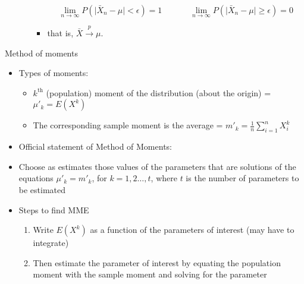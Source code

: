 \documentclass{article}
\newcommand{\convp}[2]{#1 \overset{p} \to #2}		%
\begin{document}
\begin{itemize}
\begin{itemize}
\begin{itemize}
            \[\lim_{n \to \infty} P(\lvert \bar{X}_n - \mu \rvert < \epsilon) = 1 \hspace{40pt} \lim_{n \to \infty} P(\lvert \bar{X}_n - \mu \rvert \ge \epsilon) = 0\] 
            \item[] that is, $\convp{\bar{X}}{\mu}$.
        \end{itemize}
    \end{itemize}
\end{itemize}\bigskip

Method of moments
\begin{itemize}
    \item Types of moments:
    \begin{itemize}
        \item $k^\text{th}$ (population) moment of the distribution (about the origin) = $\mu'_k = E(X^k)$
        \item The corresponding sample moment is the average = $\displaystyle m'_k = \frac{1}{n} \sum_{i = 1}^n {X^k_i}$
    \end{itemize}
    \item Official statement of Method of Moments:
    \item[] Choose as estimates those values of the parameters that are solutions of the equations $\mu'_k = m'_k$, for $k = 1, 2 \ldots, t$, where $t$ is the number of parameters to be estimated
    \item Steps to find MME
    \begin{enumerate}
        \item Write $E(X^k)$ as a function of the parameters of interest (may have to integrate)
        \item Then estimate the parameter of interest by equating the population moment with the sample moment and solving for the parameter
    \end{enumerate}
\end{itemize}\bigskip
\end{document}
